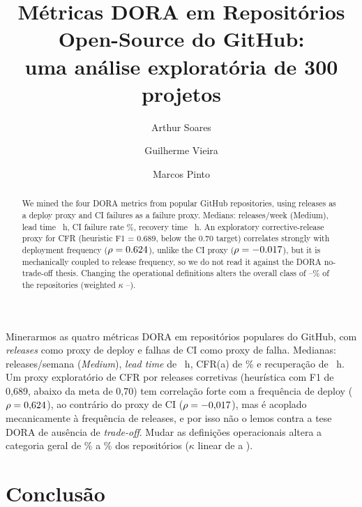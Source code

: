 \documentclass[12pt]{article}
\title{Métricas DORA em Repositórios Open-Source do GitHub:\\
uma análise exploratória de 300 projetos}
\author{Arthur Soares\inst{1} \and Guilherme Vieira\inst{1} \and Marcos Pinto\inst{1}}
\begin{document}
\maketitle

\begin{abstract}
We mined the four DORA metrics from \NEnTotal{} popular GitHub repositories, using releases as a deploy
proxy and CI failures as a failure proxy. Medians: \NEnDfMed{} releases/week (Medium), lead time
\NEnLtaMed{}~h, CI failure rate \NEnCfraMed\%, recovery time \NEnRecMed{}~h. An exploratory
corrective-release proxy for CFR (heuristic F1 = 0.689, below the 0.70 target) correlates strongly
with deployment frequency ($\rho = 0.624$), unlike the CI proxy ($\rho = -0.017$), but it is
mechanically coupled to release frequency, so we do not read it against the DORA no-trade-off thesis.
Changing the operational definitions alters the overall class of \NEnSensUmTresPct--\NEnSensUmDoisPct\% of
the repositories (weighted $\kappa$ \NEnSensUmDoisKappa--\NEnSensUmTresKappa).
\end{abstract}

\begin{resumo}
Minerarmos as quatro métricas DORA em \NTotal{} repositórios populares do GitHub, com \textit{releases}
como proxy de deploy e falhas de CI como proxy de falha. Medianas: \NDfMed{} releases/semana (\textit{Medium}),
\textit{lead time} de \NLtaMed{}~h, CFR(a) de \NCfraMed\% e recuperação de \NRecMed{}~h. Um proxy exploratório
de CFR por releases corretivas (heurística com F1 de 0,689, abaixo da meta de 0,70) tem correlação forte com a
frequência de deploy ($\rho = 0{,}624$), ao contrário do proxy de CI ($\rho = -0{,}017$), mas é acoplado
mecanicamente à frequência de releases, e por isso não o lemos contra a tese DORA de ausência de
\textit{trade-off}. Mudar as definições operacionais altera a categoria geral de \NSensUmTresPct\% a
\NSensUmDoisPct\% dos repositórios ($\kappa$ linear de \NSensUmDoisKappa{} a \NSensUmTresKappa).
\end{resumo}











\section{Conclusão}
\end{document}
